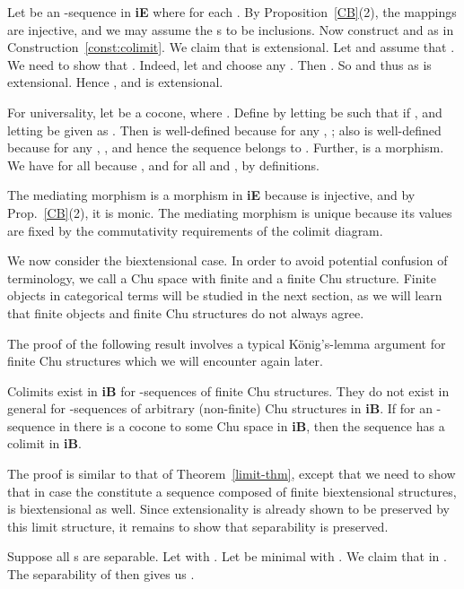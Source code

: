 \documentclass{LMCS}
\let\pf\proof
\let\epf\endproof
\begin{document}
\pf Let  be an -sequence in
{\bf iE} where  for each . By
Proposition~\ref{CB}(2), the mappings  are injective, and
we may assume the s to be inclusions. Now construct  and  as in
Construction~\ref{const:colimit}. We claim that  is
extensional. Let  and assume that
. We need to show that . Indeed, let  and choose any . Then
.  So
 and thus  as  is
extensional. Hence , and  is
extensional.





For universality, let 
be a cocone, where .  Define  by letting  be such that  if , and letting  be
given as .  Then 
is well-defined because for any , ; also  is well-defined because for any
, , and hence the sequence 
belongs to .  Further,  is a morphism. We have  for all  because , and  for
all  and , by definitions.

The mediating morphism
 is a morphism in {\bf iE} because    is injective,
and by Prop.~\ref{CB}(2), it is monic. The mediating morphism
is unique because its values are fixed by the commutativity requirements of the colimit diagram.
\epf

We now consider the biextensional case.
In order to avoid potential confusion of terminology, we call
a Chu space  with finite  and  a finite Chu structure.
Finite objects in categorical terms will be studied in the next section, as we will
learn that finite objects and finite Chu structures do not always agree.

The proof of the following result involves a typical 
K{\"o}nig's-lemma argument for finite Chu structures which we will encounter
again later.

\begin{thm}\label{limit-thmB}
  Colimits exist in {\bf iB} for -sequences of finite Chu structures. 
  They do not exist in general for -sequences of arbitrary (non-finite) Chu structures in {\bf iB}.
   If for an
  -sequence
in  there is a cocone to some Chu space in {\bf iB}, then
  the sequence has a colimit in {\bf iB}. 
\end{thm}


\pf The proof is similar to that of Theorem~\ref{limit-thm}, except
that we need to show that in case the  constitute a
sequence composed of finite biextensional structures,  is biextensional as well.  Since extensionality is already
shown to be preserved by this limit structure, it remains to show that
separability is preserved.

Suppose all s are separable.  Let  with . Let  be minimal with .  We claim
that  in . The separability of  then gives us . 
\end{document}
